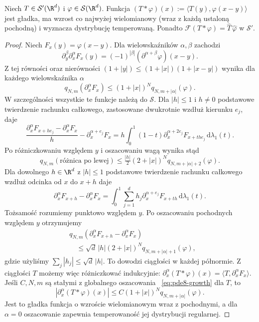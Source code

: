 \begin{twierdzenie}
\label{thm:pde8-convol-temp}
Niech $T\in\mathcal S'(\R^d)$ i $\varphi\in\mathcal S(\R^d)$.
Funkcja $(T*\varphi)(x):=\langle T(y),\varphi(x-y)\rangle$
jest gładka, ma wzrost co najwyżej wielomianowy
(wraz z każdą ustaloną pochodną) i wyznacza dystrybucję
temperowaną. Ponadto
$\mathcal F(T*\varphi)=\widehat T\,\widehat\varphi$ w $\mathcal S'$.
\end{twierdzenie}
\begin{proof}
Niech $F_x(y)=\varphi(x-y)$.
Dla wielowskaźników $\alpha,\beta$ zachodzi
\[
 \partial_y^\beta\partial_x^\alpha F_x(y)
 =(-1)^{|\beta|}(\partial^{\alpha+\beta}\varphi)(x-y).
\]
Z tej równości oraz nierówności $(1+|y|)\le(1+|x|)(1+|x-y|)$
wynika dla każdego wielowskaźnika $\alpha$
\[
 q_{N,m}(\partial_x^\alpha F_x)
 \le(1+|x|)^N q_{N,m+|\alpha|}(\varphi).
\]
W szczególności wszystkie te funkcje należą do
$\mathcal S$. Dla $|h|\le1$ i $h\ne0$ podstawowe
twierdzenie rachunku całkowego, zastosowane
dwukrotnie wzdłuż kierunku $e_j$, daje
\[
 \frac{\partial_x^\alpha F_{x+he_j}
       -\partial_x^\alpha F_x}{h}
 -\partial_x^{\alpha+e_j}F_x
 =h\int_0^1(1-t)\partial_x^{\alpha+2e_j}F_{x+the_j}
 \,\mathrm d\lambda_1(t).
\]
Po różniczkowaniu względem $y$ i oszacowaniu
wagą wynika stąd
\[
 q_{N,m}(\text{różnica po lewej})
 \le \tfrac{|h|}{2}(2+|x|)^N
 q_{N,m+|\alpha|+2}(\varphi).
\]
Dla dowolnego $h\in\R^d$ z $|h|\le1$
podstawowe twierdzenie rachunku całkowego
wzdłuż odcinka od $x$ do $x+h$ daje
\[
 \partial_x^\alpha F_{x+h}-\partial_x^\alpha F_x
 =\int_0^1\sum_{j=1}^d h_j
 \partial_x^{\alpha+e_j}F_{x+th}\,\mathrm d\lambda_1(t).
\]
Tożsamość rozumiemy punktowo względem $y$.
Po oszacowaniu pochodnych względem $y$
otrzymujemy
\[
 \begin{aligned}
 &q_{N,m}(\partial_x^\alpha F_{x+h}
             -\partial_x^\alpha F_x)\\
 &\quad\le \sqrt d\,|h|(2+|x|)^N
 q_{N,m+|\alpha|+1}(\varphi),
 \end{aligned}
\]
gdzie użyliśmy $\sum_j|h_j|\le\sqrt d\,|h|$.
To dowodzi ciągłości w każdej półnormie.
Z ciągłości $T$ możemy więc różniczkować
indukcyjnie:
$\partial_x^\alpha(T*\varphi)(x)
=\langle T,\partial_x^\alpha F_x\rangle$.
Jeśli $C,N,m$ są stałymi z globalnego oszacowania
~\eqref{eq:pde8-growth} dla $T$, to
\[
 |\partial_x^\alpha(T*\varphi)(x)|
 \le C(1+|x|)^N q_{N,m+|\alpha|}(\varphi).
\]
Jest to gładka funkcja o wzroście wielomianowym
wraz z pochodnymi, a dla $\alpha=0$ oszacowanie
zapewnia temperowaność jej dystrybucji regularnej.

\end{proof}
